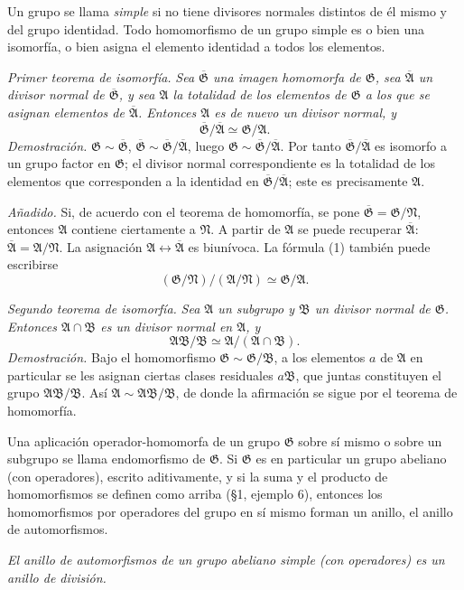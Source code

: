 \documentclass[11pt]{article}
\providecommand{\mG}{\mathfrak{G}}
\providecommand{\mA}{\mathfrak{A}}
\providecommand{\mB}{\mathfrak{B}}
\providecommand{\mN}{\mathfrak{N}}
\begin{document}
Un grupo se llama \emph{simple} si no tiene divisores normales distintos de él mismo y del grupo identidad. Todo homomorfismo de un grupo simple es o bien una isomorfía, o bien asigna el elemento identidad a todos los elementos.

\emph{Primer teorema de isomorfía.} \emph{Sea $\overline{\mG}$ una imagen homomorfa de $\mG$, sea $\overline{\mA}$ un divisor normal de $\overline{\mG}$, y sea $\mA$ la totalidad de los elementos de $\mG$ a los que se asignan elementos de $\overline{\mA}$. Entonces $\mA$ es de nuevo un divisor normal, y}
\[
        \overline{\mG}/\overline{\mA}\simeq \mG/\mA. \tag{1}
\]
\emph{Demostración.} $\mG\sim\overline{\mG}$, $\overline{\mG}\sim\overline{\mG}/\overline{\mA}$, luego $\mG\sim\overline{\mG}/\overline{\mA}$. Por tanto $\overline{\mG}/\overline{\mA}$ es isomorfo a un grupo factor en $\mG$; el divisor normal correspondiente es la totalidad de los elementos que corresponden a la identidad en $\overline{\mG}/\overline{\mA}$; este es precisamente $\mA$.

\emph{Añadido.} Si, de acuerdo con el teorema de homomorfía, se pone $\overline{\mG}=\mG/\mN$, entonces $\mA$ contiene ciertamente a $\mN$. A partir de $\mA$ se puede recuperar $\overline{\mA}$: $\overline{\mA}=\mA/\mN$. La asignación $\mA\leftrightarrow\overline{\mA}$ es biunívoca. La fórmula (1) también puede escribirse
\[
        (\mG/\mN)/(\mA/\mN)\simeq \mG/\mA.
\]

\emph{Segundo teorema de isomorfía.} \emph{Sea $\mA$ un subgrupo y $\mB$ un divisor normal de $\mG$. Entonces $\mA\cap\mB$ es un divisor normal en $\mA$, y}
\[
        \mA\mB/\mB\simeq \mA/(\mA\cap\mB).
\]
\emph{Demostración.} Bajo el homomorfismo $\mG\sim\mG/\mB$, a los elementos $a$ de $\mA$ en particular se les asignan ciertas clases residuales $a\mB$, que juntas constituyen el grupo $\mA\mB/\mB$. Así $\mA\sim\mA\mB/\mB$, de donde la afirmación se sigue por el teorema de homomorfía.

Una aplicación operador-homomorfa de un grupo $\mG$ sobre sí mismo o sobre un subgrupo se llama endomorfismo de $\mG$. Si $\mG$ es en particular un grupo abeliano (con operadores), escrito aditivamente, y si la suma y el producto de homomorfismos se definen como arriba (§1, ejemplo 6), entonces los homomorfismos por operadores del grupo en sí mismo forman un anillo, el anillo de automorfismos.

\emph{El anillo de automorfismos de un grupo abeliano simple (con operadores) es un anillo de división.}
\end{document}
